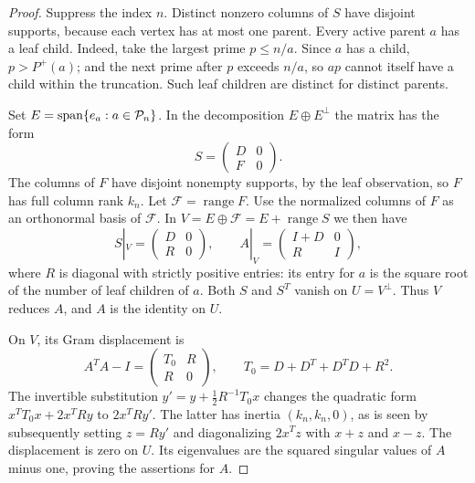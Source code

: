 \begin{proof}
Suppress the index $n$. Distinct nonzero columns of $S$ have disjoint supports, because each vertex has at most one parent. Every active parent $a$ has a leaf child. Indeed, take the largest prime $p\le n/a$. Since $a$ has a child, $p>P^+(a)$; and the next prime after $p$ exceeds $n/a$, so $ap$ cannot itself have a child within the truncation. Such leaf children are distinct for distinct parents.

Set $E=\operatorname{span}\{e_a:a\in\mathcal P_n\}$. In the decomposition $E\oplus E^\perp$ the matrix has the form
\[
 S=\begin{pmatrix}D&0\\ F&0\end{pmatrix}.
\]
The columns of $F$ have disjoint nonempty supports, by the leaf observation, so $F$ has full column rank $k_n$. Let $\mathcal F=\operatorname{range}F$. Use the normalized columns of $F$ as an orthonormal basis of $\mathcal F$. In $V=E\oplus\mathcal F=E+\operatorname{range}S$ we then have
\[
 S|_V=\begin{pmatrix}D&0\\ R&0\end{pmatrix},\qquad
 A|_V=\begin{pmatrix}I+D&0\\ R&I\end{pmatrix},
\]
where $R$ is diagonal with strictly positive entries: its entry for $a$ is the square root of the number of leaf children of $a$. Both $S$ and $S^T$ vanish on $U=V^\perp$. Thus $V$ reduces $A$, and $A$ is the identity on $U$.

On $V$, its Gram displacement is
\[
 A^TA-I=\begin{pmatrix}T_0&R\\ R&0\end{pmatrix},\qquad
 T_0=D+D^T+D^TD+R^2.
\]
The invertible substitution $y'=y+\tfrac12R^{-1}T_0x$ changes the quadratic form $x^TT_0x+2x^TRy$ to $2x^TRy'$. The latter has inertia $(k_n,k_n,0)$, as is seen by subsequently setting $z=Ry'$ and diagonalizing $2x^Tz$ with $x+z$ and $x-z$. The displacement is zero on $U$. Its eigenvalues are the squared singular values of $A$ minus one, proving the assertions for $A$.


\end{proof}
